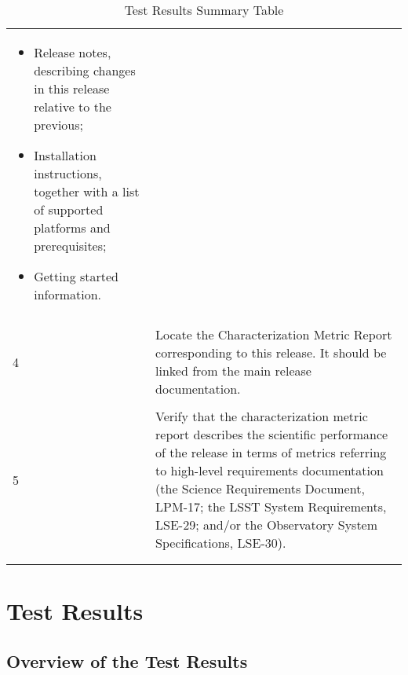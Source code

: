 \documentclass[DM,lsstdraft,STR,toc]{lsstdoc}
\providecommand{\tightlist}{
  \setlength{\itemsep}{0pt}\setlength{\parskip}{0pt}}
\begin{document}
\begin{longtable}[]{p{1.3cm}p{15cm}}
\begin{minipage}[t]{13cm}
{\begin{itemize}
\tightlist
\item
  Release notes, describing changes in this release relative to the
  previous;
\item
  Installation instructions, together with a list of supported platforms
  and prerequisites;
\item
  Getting started information.
\end{itemize}

\vspace{\dp0}
} \end{minipage} \\
\\ \midrule
\multirow{1}{*}{ 4 } &
\begin{minipage}[t]{13cm}{\footnotesize
Locate the Characterization Metric Report corresponding to this release.
It should be linked from the main release documentation.

\vspace{\dp0}
} \end{minipage} \\
\\ \midrule
\multirow{1}{*}{ 5 } &
\begin{minipage}[t]{13cm}{\footnotesize
Verify that the characterization metric report describes the scientific
performance of the release in terms of metrics referring to high-level
requirements documentation (the Science Requirements Document, LPM-17;
the LSST System Requirements, LSE-29; and/or the Observatory System
Specifications, LSE-30).

\vspace{\dp0}
} \end{minipage} \\
\\ \midrule
\caption{Test Results Summary Table}
\label{table:summary}
\end{longtable}




\newpage

\section{Test Results}
\label{sect:testresults}

\subsection{Overview of the Test Results}
\label{sect:overview}
\end{document}
